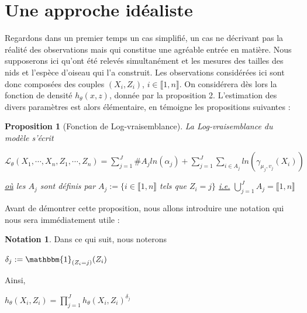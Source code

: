 \documentclass[frenchb]{report}
\newcommand{\1}{\mathbbm{1}}
\newtheorem{prop}{Proposition}
\theoremstyle{definition}\newtheorem{defn}{Définition}
\theoremstyle{definition}\newtheorem{exm}{Exemple}
\theoremstyle{definition}\newtheorem{nota}{Notation}
\theoremstyle{definition}\newtheorem{rem}{Remarque}
\begin{document}
\section{Une approche idéaliste}

Regardons dans un premier temps un cas simplifié, un cas ne décrivant pas la réalité des observations mais qui constitue une agréable entrée en matière. \newline
Nous supposerons ici qu'ont été relevés simultanément et les mesures des tailles des nids et l'espèce d'oiseau qui l'a construit. Les observations considérées ici sont donc composées des couples $(X_i, Z_i)$, $i \in \llbracket1,n \rrbracket$. On considérera dès lors la fonction de densité $h_\theta(x,z)$, donnée par la proposition 2. \newline
L'estimation des divers paramètres est alors élémentaire, en témoigne les propositions suivantes :
\begin{prop}[Fonction de Log-vraisemblance]
La Log-vraisemblance du modèle s'écrit
\begin{center} $\mathcal{L}_\theta(X_1, \cdots, X_n, Z_1, \cdots, Z_n) = \displaystyle \sum_{j=1}^J \#A_j ln(\alpha_j) + \sum_{j=1}^J\sum_{i\in A_j}ln(\gamma_{\mu_j, v_j}(X_i))$ \end{center}
\underline{où} les $A_j$ sont définis par $A_j := \{ i\in \llbracket1,n \rrbracket$ tels que $Z_i = j \}$ \underline{i.e.} $\displaystyle\bigcup_{j=1}^J A_j = \llbracket1,n \rrbracket$
\end{prop}
Avant de démontrer cette proposition, nous allons introduire une notation qui nous sera immédiatement utile :
\begin{nota}
Dans ce qui suit, nous noterons
\begin{center}
$\delta_j := \1_{(Z_i = j)}(Z_i)$
\end{center}
Ainsi, 
\begin{center}
$h_\theta(X_i, Z_i) = \displaystyle\prod_{j=1}^J h_\theta(X_i, Z_i)^{\delta_j}$
\end{center}
\end{nota}
\end{document}
